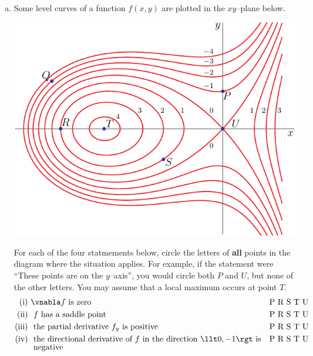 


\subsection*{\Conceptual}

\begin{question}[M200 2016D] %
\begin{enumerate}[(a)]
\item
Some level curves of a function $f(x,y)$ are plotted in the $xy$--plane 
below. 

\begin{center}
     \includegraphics[scale=1.4]{fig/OE16D_2a.pdf}
\end{center}

For each of the four statmements below, circle the letters of
\textbf{all} points in the diagram where the situation applies.
For example, if the statement were ``These points are on the $y$--axis'', you would circle both $P$ and $U$, but none of the other letters.
You may assume that a local maximum occurs at point $T$. 
\begin{align*}
\text{(i) }& \vnabla f\text{ is zero} & &\text{P R S T U} \\
\text{(ii) }& \text{ $f$ has a saddle point} & &\text{P R S T U} \\
\text{(iii) }& \text{ the partial derivative $f_y$ is positive} & &\text{P R S T U} \\
\text{(iv) }& \text{ the directional derivative of $f$ in the 
                 direction $\llt 0,-1\rgt$ is} & &\text{P R S T U} \\[-0.07in]
          & \text{ negative} & & 
\end{align*}



\end{enumerate}
\end{question}
